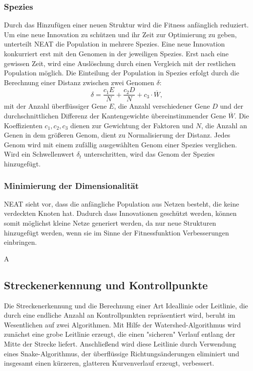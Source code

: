 \documentclass[11pt,final,journal,a4paper,towside,towcolumn]{IEEEtran}
\begin{document}
\subsubsection{Spezies}
Durch das Hinzufügen einer neuen Struktur wird die Fitness anfänglich reduziert. Um eine neue Innovation zu schützen und ihr Zeit zur Optimierung zu geben, unterteilt \ac{NEAT} die Population in mehrere Spezies. Eine neue Innovation konkurriert erst mit den Genomen in der jeweiligen Spezies. Erst nach eine gewissen Zeit, wird eine Auslöschung durch einen Vergleich mit der restlichen Population möglich. Die Einteilung der Population in Spezies erfolgt durch die Berechnung einer Distanz zwischen zwei Genomen $\delta$:
\begin{equation}
\delta=\frac{c_1E}{N} + \frac{c_2D}{N} + c_3\cdot \overline{W},
\end{equation}
mit der Anzahl überflüssiger Gene $E$, die Anzahl verschiedener Gene $D$ und der durchschnittlichen Differenz der Kantengewichte übereinstimmender Gene $\overline{W}$. Die Koeffizienten $c_1, c_2, c_3$ dienen zur Gewichtung der Faktoren und $N$, die Anzahl an Genen in dem größeren Genom, dient zu Normalisierung der Distanz. Jedes Genom wird mit einem zufällig ausgewählten Genom einer Spezies verglichen. Wird ein Schwellenwert $\delta_t$ unterschritten, wird das Genom der Spezies hinzugefügt.
\subsubsection{Minimierung der Dimensionalität}
\ac{NEAT} sieht vor, dass die anfängliche Population aus Netzen besteht, die keine verdeckten Knoten hat. Dadurch dass Innovationen geschützt werden, können somit möglichst kleine Netze generiert werden, da nur neue Strukturen hinzugefügt werden, wenn sie im Sinne der Fitnessfunktion Verbesserungen einbringen.

A

\subsection{Streckenerkennung und Kontrollpunkte}
Die Streckenerkennung und die Berechnung einer Art Ideallinie oder Leitlinie, die durch eine endliche Anzahl an Kontrollpunkten repräsentiert wird, beruht im Wesentlichen auf zwei Algorithmen. Mit Hilfe der Watershed-Algorithmus wird zunächst eine grobe Leitlinie erzeugt, die einen "sicheren" Verlauf entlang der Mitte der Strecke liefert. Anschließend wird diese Leitlinie durch Verwendung eines Snake-Algorithmus, der überflüssige Richtungsänderungen eliminiert und insgesamt einen kürzeren, glatteren Kurvenverlauf erzeugt, verbessert.
\end{document}
